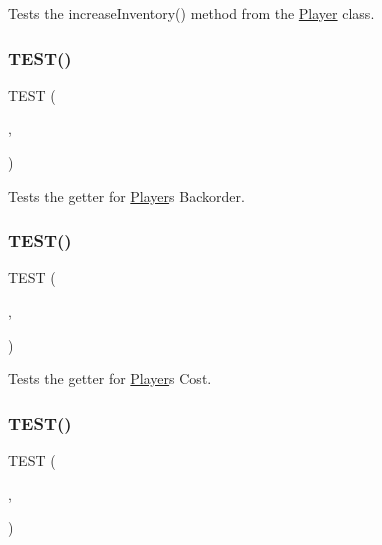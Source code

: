 Tests the increase\+Inventory() method from the \hyperlink{classPlayer}{Player} class. \mbox{\label{group__group1_ga8e511a4ee9c7bca45280ada45bf604af}} 
\subsubsection{\texorpdfstring{T\+E\+S\+T()}{TEST()}\hspace{0.1cm}{\footnotesize\ttfamily [7/18]}}
{\footnotesize\ttfamily T\+E\+ST (\begin{DoxyParamCaption}\item[{player\+Test}]{,  }\item[{get\+Backorder\+Test}]{ }\end{DoxyParamCaption})}

Tests the getter for \hyperlink{classPlayer}{Player}\textquotesingle{}s Backorder. \mbox{\label{group__group1_ga4ad9313eebacc240151baec8ff51463d}} 
\subsubsection{\texorpdfstring{T\+E\+S\+T()}{TEST()}\hspace{0.1cm}{\footnotesize\ttfamily [8/18]}}
{\footnotesize\ttfamily T\+E\+ST (\begin{DoxyParamCaption}\item[{player\+Test}]{,  }\item[{get\+Cost\+Test}]{ }\end{DoxyParamCaption})}

Tests the getter for \hyperlink{classPlayer}{Player}\textquotesingle{}s Cost. \mbox{\label{group__group1_gafca31a7c90ab705132fee1865c93b0aa}} 
\subsubsection{\texorpdfstring{T\+E\+S\+T()}{TEST()}\hspace{0.1cm}{\footnotesize\ttfamily [9/18]}}
{\footnotesize\ttfamily T\+E\+ST (\begin{DoxyParamCaption}\item[{player\+Test}]{,  }\item[{get\+Inventory\+Test}]{ }\end{DoxyParamCaption})}

